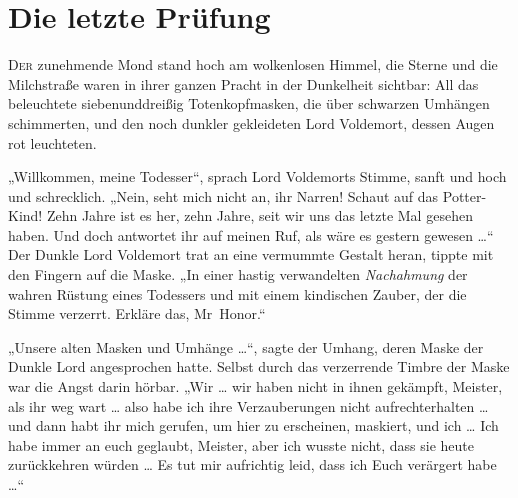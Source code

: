 \chapter{Die letzte Prüfung}

\lettrine{D}{er} zunehmende Mond stand hoch am wolkenlosen Himmel, die Sterne und die Milchstraße waren in ihrer ganzen Pracht in der Dunkelheit sichtbar: All das beleuchtete siebenunddreißig Totenkopfmasken, die über schwarzen Umhängen schimmerten, und den noch dunkler gekleideten Lord Voldemort, dessen Augen rot leuchteten.

„Willkommen, meine Todesser“, sprach Lord Voldemorts Stimme, sanft und hoch und schrecklich.
„Nein, seht mich nicht an, ihr Narren! Schaut auf das Potter-Kind! Zehn Jahre ist es her, zehn Jahre, seit wir uns das letzte Mal gesehen haben. Und doch antwortet ihr auf meinen Ruf, als wäre es gestern gewesen …“
Der Dunkle Lord Voldemort trat an eine vermummte Gestalt heran, tippte mit den Fingern auf die Maske.
„In einer hastig verwandelten \emph{Nachahmung} der wahren Rüstung eines Todessers und mit einem kindischen Zauber, der die Stimme verzerrt. Erkläre das, Mr~Honor.“

„Unsere alten Masken und Umhänge …“, sagte der Umhang, deren Maske der Dunkle Lord angesprochen hatte. Selbst durch das verzerrende Timbre der Maske war die Angst darin hörbar.
„Wir … wir haben nicht in ihnen gekämpft, Meister, als ihr weg wart … also habe ich ihre Verzauberungen nicht aufrechterhalten … und dann habt ihr mich gerufen, um hier zu erscheinen, maskiert, und ich … Ich habe immer an euch geglaubt, Meister, aber ich wusste nicht, dass sie heute zurückkehren würden … Es tut mir aufrichtig leid, dass ich Euch verärgert habe …“

